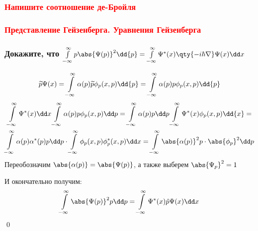 \subsubsection{\textcolor{red} {Напишите соотношение де-Бройля} }
\subsubsection{\textcolor{red} {Представление Гейзенберга. Уравнения Гейзенберга} }
\subsubsection{Докажите, что $\infint p \abs{\Psi(p)}^2\dd{p}=\infint\Psi^*(x)\qty{-i\hbar\nabla}\Psi(x)\dd x$}

{}

$$\tilde p\Psi(x)=\infint \alpha(p)\tilde p \phi_p(x,p)\dd{p}=\infint\alpha(p) p\phi_p(x,p)\dd{p}$$
\begin{gather*}
	\infint \Psi^*(x)\dd x\infint \alpha(p) p \phi_p(x,p)\dd p=
	\infint \alpha(p)p\dd p \infint \Psi^* (x) \phi_p(x,p) \dd{x}=
	\\
	\infint \alpha(p) \alpha^*(p) p \dd p \cdot \infint \phi_p(x,p) \phi^*_p(x,p) \dd x=\infint \abs{\alpha(p)}^2 p\cdot \abs{\phi_p}^2 \dd p
\end{gather*}
Переобозначим $\abs{\alpha(p)}=\abs{\Psi(p)}$, а также выберем $\abs{\Psi_p}^2=1$

И окончательно получим:
$$\infint \abs{\Psi(p)}^2 p \dd p = \infint \Psi^*(x) \hat p \Psi(x) \dd x $$
\qed